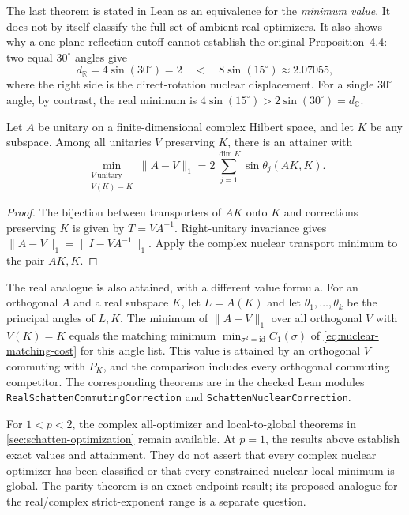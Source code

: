The last theorem is stated in Lean as an equivalence for the
\emph{minimum value}. It does not by itself classify the full set of
ambient real optimizers. It also shows why a one-plane reflection cutoff
cannot establish the original Proposition~4.4: two equal
$30^\circ$ angles give
\[
  d_{\mathbb R}=4\sin(30^\circ)=2
  \quad<\quad8\sin(15^\circ)\approx2.07055,
\]
where the right side is the direct-rotation nuclear displacement.
For a single $30^\circ$ angle, by contrast, the real minimum is
$4\sin(15^\circ)>2\sin(30^\circ)=d_{\mathbb C}$.

\begin{corollary}
\label{cor:nuclear-unitary-rounding}
Let $A$ be unitary on a finite-dimensional complex Hilbert space, and
let $K$ be any subspace. Among all unitaries $V$ preserving $K$,
there is an attainer with
\begin{equation}
 \boxed{\displaystyle
 \min_{\substack{V\ \mathrm{unitary}\\V(K)=K}}\|A-V\|_1
 =2\sum_{j=1}^{\dim K}\sin\theta_j(AK,K).}
 \label{eq:nuclear-unitary-rounding}
\end{equation}
\end{corollary}

\begin{proof}
The bijection between transporters of $AK$ onto $K$ and corrections
preserving $K$ is given by $T=VA^{-1}$. Right-unitary invariance gives
$\|A-V\|_1=\|I-VA^{-1}\|_1$. Apply the complex nuclear transport
minimum to the pair $AK,K$.
\end{proof}

The real analogue is also attained, with a different value formula.
For an orthogonal $A$ and a real subspace $K$, let
$L=A(K)$ and let $\theta_1,\ldots,\theta_k$ be the principal angles
of $L,K$. The minimum of $\|A-V\|_1$ over all orthogonal $V$ with
$V(K)=K$ equals the matching minimum
$\min_{\sigma^2=\mathrm{id}} C_1(\sigma)$ of
\cref{eq:nuclear-matching-cost} for this angle list. This value is
attained by an orthogonal $V$ commuting with $P_K$, and the comparison
includes every orthogonal commuting competitor. The corresponding theorems are in the checked Lean modules
\texttt{RealSchattenCommutingCorrection} and
\texttt{SchattenNuclearCorrection}.

For $1<p<2$, the complex all-optimizer and local-to-global theorems in
\cref{sec:schatten-optimization} remain available. At $p=1$, the
results above establish exact values and attainment. They do not assert
that every complex nuclear optimizer has been classified or that every
constrained nuclear local minimum is global. The parity theorem is an
exact endpoint result; its proposed analogue for the real/complex
strict-exponent range is a separate question.
